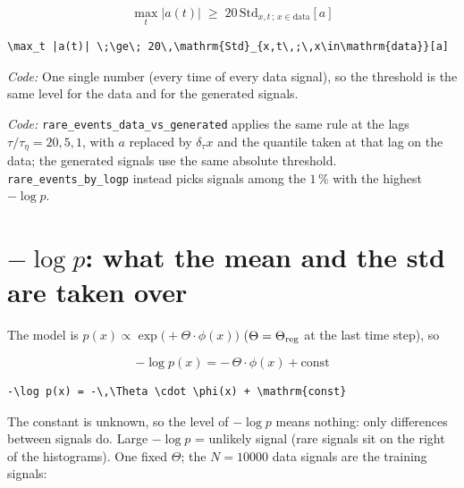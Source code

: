 \documentclass[11pt]{article}
\newcommand{\codenote}[1]{{\small\color{notegray}\emph{Code:} #1\par}}
\begin{document}
\[
\max_t |a(t)| \;\ge\; 20\,\mathrm{Std}_{x,t\,;\,x\in\mathrm{data}}[a]
\]
\begin{lstlisting}
\max_t |a(t)| \;\ge\; 20\,\mathrm{Std}_{x,t\,;\,x\in\mathrm{data}}[a]
\end{lstlisting}
\codenote{One single number (every time of every data signal), so the threshold is the same level for the data and for the generated signals.}
\codenote{\texttt{rare\_events\_data\_vs\_generated} applies the same rule at the lags $\tau/\tau_\eta = 20, 5, 1$, with $a$ replaced by $\delta_\tau x$ and the quantile taken at that lag on the data; the generated signals use the same absolute threshold. \texttt{rare\_events\_by\_logp} instead picks signals among the $1\,\%$ with the highest $-\log p$.}
\section{$-\log p$: what the mean and the std are taken over}
The model is $p(x) \propto \exp\!\big(+\Theta \cdot \phi(x)\big)$ ($\Theta = \Theta_{\rm reg}$ at the last time step), so

\[
-\log p(x) = -\,\Theta \cdot \phi(x) + \mathrm{const}
\]
\begin{lstlisting}
-\log p(x) = -\,\Theta \cdot \phi(x) + \mathrm{const}
\end{lstlisting}
The constant is unknown, so the level of $-\log p$ means nothing: only differences between signals do. Large $-\log p$ = unlikely signal (rare signals sit on the right of the histograms). One fixed $\Theta$; the $N = 10000$ data signals are the training signals:
\end{document}
